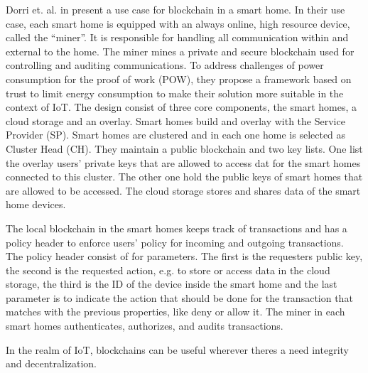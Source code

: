 Dorri et. al. in \cite{Dorri2017SmartHome} present a use case for blockchain in a smart home. In their use case, each smart home is equipped with an always online, high resource device, called the ``miner''. It is responsible for handling all communication within and external to the home.
The miner mines a private and secure blockchain used for controlling and auditing communications. To address challenges of power consumption for the proof of work (POW), they propose a framework based on trust to limit energy consumption to make their solution more suitable in the context of IoT.
The design consist of three core components, the smart homes, a cloud storage and an overlay.
Smart homes build and overlay with the Service Provider (SP). Smart homes are clustered and in each one home is selected as Cluster Head (CH).
They maintain a public blockchain and two key lists. One list the overlay users' private keys that are allowed to access dat for the smart homes connected to this cluster.
The other one hold the public keys of smart homes that are allowed to be accessed.
The cloud storage stores and shares data of the smart home devices.

The local blockchain in the smart homes keeps track of transactions and has a policy header to enforce users' policy for incoming and outgoing transactions.
The policy header consist of for parameters. The first is the requesters public key, the second is the requested action, e.g. to store or access data in the cloud storage, the third is the ID of the device inside the smart home
and the last parameter is to indicate the action that should be done for the transaction that matches with the previous properties, like deny or allow it.
The miner in each smart homes authenticates, authorizes, and audits transactions.


In the realm of IoT, blockchains can be useful wherever theres a need integrity and decentralization.
